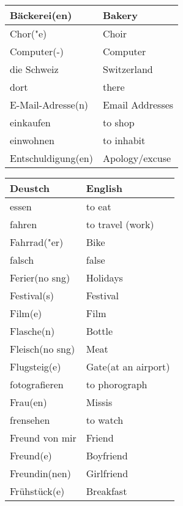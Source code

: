 \documentclass{article}
\renewcommand{\arraystretch}{1}
\begin{document}
\begin{minipage}{0.48\textwidth}
\begin{tabular}{|>{\raggedright\arraybackslash}p{3.5cm}|>{\raggedright\arraybackslash}p{3.5cm}|}
        Bäckerei(en) & Bakery \\\hline
        Chor("e) & Choir \\\hline
        Computer(-) & Computer \\\hline
        die Schweiz & Switzerland \\\hline
        dort & there \\\hline
        E-Mail-Adresse(n) & Email Addresses \\\hline
        einkaufen & to shop \\\hline
        einwohnen & to inhabit \\\hline
        Entschuldigung(en) & Apology/excuse \\\hline
    \end{tabular}
\end{minipage}%
\hfill
\begin{minipage}{0.48\textwidth}
    \centering
    \renewcommand{\arraystretch}{1.5}
    \begin{tabular}{|>{\raggedright\arraybackslash}p{3.5cm}|>{\raggedright\arraybackslash}p{3.5cm}|}
        \hline
        \rowcolor{gray!20} \textbf{Deustch} & \textbf{English} \\
        \hline
        essen & to eat \\\hline
        fahren & to travel (work) \\\hline
        Fahrrad("er) & Bike \\\hline
        falsch & false \\\hline
        Ferier(no sng) & Holidays \\\hline
        Festival(s) & Festival \\\hline
        Film(e) & Film \\\hline
        Flasche(n) & Bottle \\\hline
        Fleisch(no sng) & Meat \\\hline
        Flugsteig(e) & Gate(at an airport) \\\hline
        fotografieren & to phorograph \\\hline
        Frau(en) & Missis \\\hline
        frensehen & to watch  \\\hline
        Freund von mir & Friend \\\hline
        Freund(e) & Boyfriend \\\hline
        Freundin(nen) & Girlfriend \\\hline
        Frühstück(e) & Breakfast \\\hline

\end{tabular}
\end{minipage}
\end{document}
